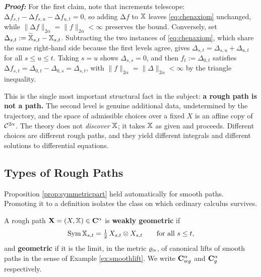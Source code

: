 \textbf{\textit{Proof:}} For the first claim, note that increments telescope: $\increment{f}_{s,t} -
\increment{f}_{s,u} - \increment{f}_{u,t} = 0$, so adding $\increment{f}$ to $\mathbb{X}$ leaves
\eqref{eq:chenaxiom} unchanged, while $\lVert\increment{f}\rVert_{2\alpha} = \lVert f\rVert_{2\alpha}
< \infty$ preserves the bound. Conversely, set $\Delta_{s,t} := \widetilde{\mathbb{X}}_{s,t} - \mathbb{X}_{s,t}$.
Subtracting the two instances of \eqref{eq:chenaxiom}, which share the same right-hand side because
the first levels agree, gives $\Delta_{s,t} = \Delta_{s,u} + \Delta_{u,t}$ for all $s\leq u\leq t$.
Taking $s=u$ shows $\Delta_{s,s}=0$, and then $f_t := \Delta_{0,t}$ satisfies
$\increment{f}_{s,t} = \Delta_{0,t}-\Delta_{0,s} = \Delta_{s,t}$, with
$\lVert f\rVert_{2\alpha} = \lVert\Delta\rVert_{2\alpha} < \infty$ by the triangle inequality.
\qedfilledtext

\medskip

This is the single most important structural fact in the subject: \textbf{a rough path is not a path.} The second level is genuine additional data, undetermined by
the trajectory, and the space of admissible choices over a fixed $X$ is an affine copy of
$\mathcal{C}^{2\alpha}$. The theory does not \emph{discover} $\mathbb{X}$; it takes $\mathbb{X}$ as given and
proceeds. Different choices are different rough paths, and they yield different integrals and different solutions to differential
equations. 

\subsection{Types of Rough Paths}\label{subsec:typesofrp}

Proposition \ref{prop:symmetricpart} held automatically for smooth paths. Promoting it to a
definition isolates the class on which ordinary calculus survives.

\begin{definition}\label{def:geometric}
A rough path $\mathbf{X} = (X,\mathbb{X}) \in \mathbf{C}^{\alpha}$ is \textbf{weakly geometric} if
\begin{equation}\label{eq:weaklygeometric}
\operatorname{Sym}\mathbb{X}_{s,t} = \tfrac12\, X_{s,t}\otimes X_{s,t} \qquad \text{for all } s \leq t ,
\end{equation}
and \textbf{geometric} if it is the limit, in the metric $\varrho_{\alpha}$, of canonical lifts of smooth
paths in the sense of Example \ref{ex:smoothlift}. We write $\mathbf{C}_{wg}^{\alpha}$ and $\mathbf{C}_{g}^{\alpha}$
respectively.
\end{definition}

